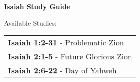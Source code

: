 \documentclass[11pt]{article}
\begin{document}
\begin{center}
{\Huge\bfseries Isaiah Study Guide}
\end{center}
\vspace{20pt}

\begin{center}
{\Large Available Studies:}
\end{center}
\vspace{15pt}

\begin{center}
\begin{tabular}{l}
\textbf{Isaiah 1:2-31} - Problematic Zion \\
\textbf{Isaiah 2:1-5} - Future Glorious Zion \\
\textbf{Isaiah 2:6-22} - Day of Yahweh \\
\end{tabular}
\end{center}

\vspace{30pt}

\end{document}
